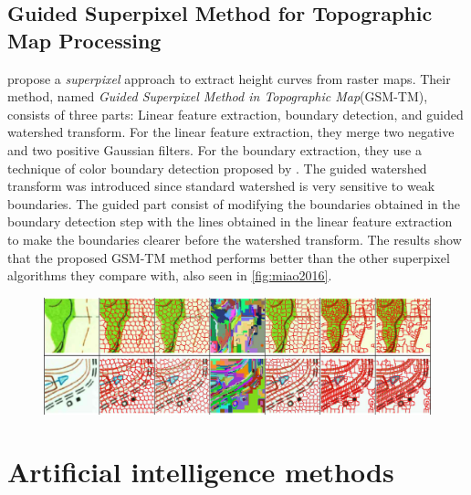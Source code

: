 \subsection{Guided Superpixel Method for Topographic Map Processing}
\citet{Miao2016} propose a \emph{superpixel}\cite{Ren2003} approach to extract height curves from raster maps. Their method, named \emph{Guided Superpixel Method in Topographic Map}(GSM-TM), consists of three parts: Linear feature extraction, boundary detection, and guided watershed transform. For the linear feature extraction, they merge two negative and two positive Gaussian filters. For the boundary extraction, they use a technique of color boundary detection proposed by \citet{Yang2013}. The guided watershed transform was introduced since standard watershed is very sensitive to weak boundaries. The guided part consist of modifying the boundaries obtained in the boundary detection step with the lines obtained in the linear feature extraction to make the boundaries clearer before the watershed transform. The results show that the proposed GSM-TM method performs better than the other superpixel algorithms they compare with, also seen in \autoref{fig:miao2016}. 

\begin{figure}[H]
    \centering
    \includegraphics[width=0.9\linewidth]{fig/miao2016.png}
    \label{fig:miao2016}
\end{figure}

\section{Artificial intelligence methods}

